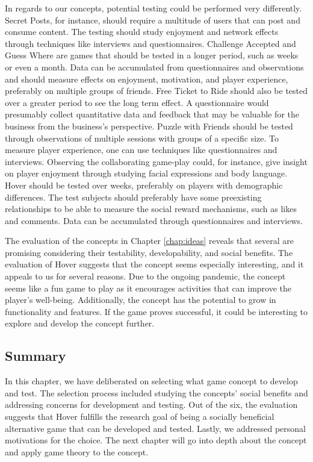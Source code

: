 \documentclass[../Main.tex]{subfiles}
\begin{document}
In regards to our concepts, potential testing could be performed very differently. Secret Posts, for instance, should require a multitude of users that can post and consume content. The testing should study enjoyment and network effects through techniques like interviews and questionnaires. Challenge Accepted and Guess Where are games that should be tested in a longer period, such as weeks or even a month. Data can be accumulated from questionnaires and observations and should measure effects on enjoyment, motivation, and player experience, preferably on multiple groups of friends. Free Ticket to Ride should also be tested over a greater period to see the long term effect. A questionnaire would presumably collect quantitative data and feedback that may be valuable for the business from the business’s perspective. Puzzle with Friends should be tested through observations of multiple sessions with groups of a specific size. To measure player experience, one can use techniques like questionnaires and interviews. Observing the collaborating game-play could, for instance, give insight on player enjoyment through studying facial expressions and body language. Hover should be tested over weeks, preferably on players with demographic differences. The test subjects should preferably have some preexisting relationships to be able to measure the social reward mechanisms, such as likes and comments. Data can be accumulated through questionnaires and interviews.

The evaluation of the concepts in Chapter \ref{chap:ideas} reveals that several are promising considering their testability, developability, and social benefits. The evaluation of Hover suggests that the concept seems especially interesting, and it appeals to us for several reasons. Due to the ongoing pandemic, the concept seems like a fun game to play as it encourages activities that can improve the player’s well-being. Additionally, the concept has the potential to grow in functionality and features. If the game proves successful, it could be interesting to explore and develop the concept further.


\subsection{Summary}
In this chapter, we have deliberated on selecting what game concept to develop and test. The selection process included studying the concepts’ social benefits and addressing concerns for development and testing. Out of the six, the evaluation suggests that Hover fulfills the research goal of being a socially beneficial alternative game that can be developed and tested. Lastly, we addressed personal motivations for the choice. The next chapter will go into depth about the concept and apply game theory to the concept.


\biblio %
\end{document}
